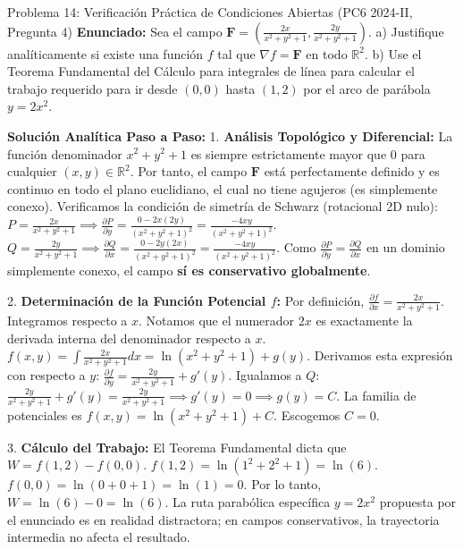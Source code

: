\documentclass[11pt,a4paper]{article}
\begin{document}
\begin{ejerciciobox}{Problema 14: Verificación Práctica de Condiciones Abiertas (PC6 2024-II, Pregunta 4)}
\textbf{Enunciado:}
Sea el campo $\mathbf{F} = \left( \frac{2x}{x^2+y^2+1}, \frac{2y}{x^2+y^2+1} \right)$.
a) Justifique analíticamente si existe una función $f$ tal que $\nabla f = \mathbf{F}$ en todo $\mathbb{R}^2$.
b) Use el Teorema Fundamental del Cálculo para integrales de línea para calcular el trabajo requerido para ir desde $(0,0)$ hasta $(1,2)$ por el arco de parábola $y = 2x^2$.

\textbf{Solución Analítica Paso a Paso:}
1. \textbf{Análisis Topológico y Diferencial:}
La función denominador $x^2+y^2+1$ es siempre estrictamente mayor que $0$ para cualquier $(x,y) \in \mathbb{R}^2$. Por tanto, el campo $\mathbf{F}$ está perfectamente definido y es continuo en todo el plano euclidiano, el cual no tiene agujeros (es simplemente conexo).
Verificamos la condición de simetría de Schwarz (rotacional 2D nulo):
$P = \frac{2x}{x^2+y^2+1} \implies \frac{\partial P}{\partial y} = \frac{0 - 2x(2y)}{(x^2+y^2+1)^2} = \frac{-4xy}{(x^2+y^2+1)^2}$.
$Q = \frac{2y}{x^2+y^2+1} \implies \frac{\partial Q}{\partial x} = \frac{0 - 2y(2x)}{(x^2+y^2+1)^2} = \frac{-4xy}{(x^2+y^2+1)^2}$.
Como $\frac{\partial P}{\partial y} = \frac{\partial Q}{\partial x}$ en un dominio simplemente conexo, el campo \textbf{sí es conservativo globalmente}.

2. \textbf{Determinación de la Función Potencial $f$:}
Por definición, $\frac{\partial f}{\partial x} = \frac{2x}{x^2+y^2+1}$.
Integramos respecto a $x$. Notamos que el numerador $2x$ es exactamente la derivada interna del denominador respecto a $x$.
$f(x,y) = \int \frac{2x}{x^2+y^2+1} dx = \ln(x^2+y^2+1) + g(y)$.
Derivamos esta expresión con respecto a $y$:
$\frac{\partial f}{\partial y} = \frac{2y}{x^2+y^2+1} + g'(y)$.
Igualamos a $Q$:
$\frac{2y}{x^2+y^2+1} + g'(y) = \frac{2y}{x^2+y^2+1} \implies g'(y) = 0 \implies g(y) = C$.
La familia de potenciales es $f(x,y) = \ln(x^2+y^2+1) + C$. Escogemos $C=0$.

3. \textbf{Cálculo del Trabajo:}
El Teorema Fundamental dicta que $W = f(1,2) - f(0,0)$.
$f(1,2) = \ln(1^2 + 2^2 + 1) = \ln(6)$.
$f(0,0) = \ln(0 + 0 + 1) = \ln(1) = 0$.
Por lo tanto, $W = \ln(6) - 0 = \ln(6)$. La ruta parabólica específica $y = 2x^2$ propuesta por el enunciado es en realidad distractora; en campos conservativos, la trayectoria intermedia no afecta el resultado.

\end{ejerciciobox}
\end{document}
